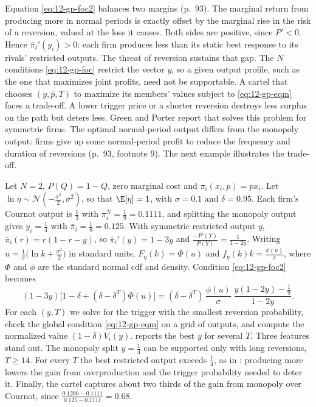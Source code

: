 Equation \eqref{eq:12-gp-foc2} balances two margins (p.~93). The marginal return from producing more in normal
periods is exactly offset by the marginal rise in the risk of a reversion, valued at the loss it causes. Both sides
are positive, since $P' < 0$. Hence $\bar\pi_i'(y_i) > 0$: each firm produces less than its static best
response to its rivals' restricted outputs. The threat of reversion sustains that gap. The $N$ conditions
\eqref{eq:12-gp-foc} restrict the vector $y$, so a given output profile, such as the one that maximizes joint profits,
need not be supportable. A cartel that chooses $(y, \bar p, T)$ to maximize its members' values subject to
\eqref{eq:12-gp-eqm} faces a trade-off. A lower trigger price or a shorter reversion destroys less surplus on the
path but deters less. Green and Porter report that \citet{Porter1983b} solves this problem for symmetric firms. The
optimal normal-period output differs from the monopoly output: firms give up some normal-period profit to reduce the
frequency and duration of reversions (p.~93, footnote 9). The next example illustrates the trade-off.

\begin{example}\label{ex:12-gp-linear}
Let $N = 2$, $P(Q) = 1 - Q$, zero marginal cost and $\pi_i(x_i, p) = px_i$. Let
$\ln\eta \sim \mathcal{N}(-\frac{\sigma^2}{2}, \sigma^2)$, so that $\E[\eta] = 1$, with $\sigma = 0.1$ and
$\delta = 0.95$. Each firm's Cournot output is $\frac{1}{3}$ with $\pi_i^N = \frac{1}{9} = 0.1111$, and splitting the
monopoly output gives $y_i = \frac{1}{4}$ with $\bar\pi_i = \frac{1}{8} = 0.125$. With symmetric restricted output
$y$, $\bar\pi_i(r) = r(1 - r - y)$, so $\bar\pi_i'(y) = 1 - 3y$ and $\frac{-P'(Y)}{P(Y)} = \frac{1}{1 - 2y}$. Writing
$u = \frac{1}{\sigma}\bigl(\ln k + \frac{\sigma^2}{2}\bigr)$ in standard units, $F_\eta(k) = \Phi(u)$ and $f_\eta(k)k = \frac{\phi(u)}{\sigma}$,
where $\Phi$ and $\phi$ are the standard normal cdf and density. Condition \eqref{eq:12-gp-foc2} becomes
\begin{equation*}
(1 - 3y)\bigl[1 - \delta + (\delta - \delta^T)\Phi(u)\bigr]
= (\delta - \delta^T)\,\frac{\phi(u)}{\sigma}\;\frac{y(1 - 2y) - \frac{1}{9}}{1 - 2y} .
\end{equation*}
For each $(y, T)$ we solve for the trigger with the smallest reversion probability, check the global condition
\eqref{eq:12-gp-eqm} on a grid of outputs, and compute the normalized value $(1 - \delta)V_i(y)$.
 reports the best $y$ for several $T$. Three features stand out. The monopoly split
$y = \frac{1}{4}$ can be supported only with long reversions, $T \ge 14$. For every $T$ the best restricted output
exceeds $\frac{1}{4}$, as in \citet{Porter1983b}: producing more lowers the gain from overproduction and the trigger
probability needed to deter it. Finally, the cartel captures about two thirds of the gain from monopoly over
Cournot, since $\frac{0.1206 - 0.1111}{0.125 - 0.1111} = 0.68$.
\end{example}

